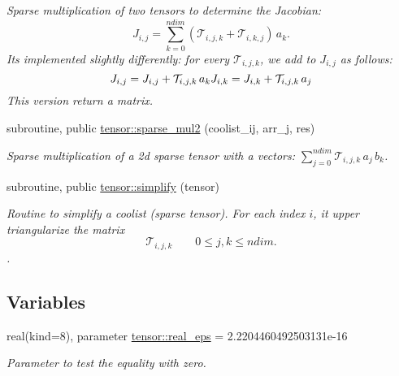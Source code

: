 \begin{DoxyCompactItemize}
\begin{DoxyCompactList}\small\item\em Sparse multiplication of two tensors to determine the Jacobian\+: \[J_{i,j} = {\displaystyle \sum_{k=0}^{ndim}} \left( \mathcal{T}_{i,j,k} + \mathcal{T}_{i,k,j} \right) \, a_k.\] It\textquotesingle{}s implemented slightly differently\+: for every $\mathcal{T}_{i,j,k}$, we add to $J_{i,j}$ as follows\+: \[J_{i,j} = J_{i,j} + \mathcal{T}_{i,j,k} \, a_k \\ J_{i,k} = J_{i,k} + \mathcal{T}_{i,j,k} \, a_j\] This version return a matrix. \end{DoxyCompactList}\item 
subroutine, public \hyperlink{namespacetensor_a70230d57c615d9548905bc023f5fc01d}{tensor\+::sparse\+\_\+mul2} (coolist\+\_\+ij, arr\+\_\+j, res)
\begin{DoxyCompactList}\small\item\em Sparse multiplication of a 2d sparse tensor with a vectors\+: ${\displaystyle \sum_{j=0}^{ndim}} \mathcal{T}_{i,j,k} \, a_j \,b_k$. \end{DoxyCompactList}\item 
subroutine, public \hyperlink{namespacetensor_a364522b80ab0f4785c331eb74fa1ba04}{tensor\+::simplify} (tensor)
\begin{DoxyCompactList}\small\item\em Routine to simplify a coolist (sparse tensor). For each index $i$, it upper triangularize the matrix \[\mathcal{T}_{i,j,k} \qquad 0 \leq j,k \leq ndim.\]. \end{DoxyCompactList}\end{DoxyCompactItemize}
\subsection*{Variables}
\begin{DoxyCompactItemize}
\item 
real(kind=8), parameter \hyperlink{namespacetensor_a2a2ab182d86107e62533c3f0043652cc}{tensor\+::real\+\_\+eps} = 2.\+2204460492503131e-\/16
\begin{DoxyCompactList}\small\item\em Parameter to test the equality with zero. \end{DoxyCompactList}\end{DoxyCompactItemize}

